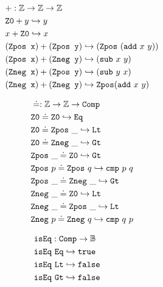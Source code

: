 \begin{figure}
\centering
\begin{minipage}[t]{0.48\textwidth}
\begin{align*}
&+: \mathbb{Z} \rightarrow \mathbb{Z} \rightarrow \mathbb{Z} \\
& \texttt{Z0} + y \hookrightarrow y \\
& x + \texttt{Z0} \hookrightarrow x \\
& (\texttt{Zpos x}) + (\texttt{Zpos y}) \hookrightarrow (\texttt{Zpos}~(\texttt{add}~x~y))  \\
& (\texttt{Zpos x}) + (\texttt{Zneg y}) \hookrightarrow (\texttt{sub}~x~y)  \\
& (\texttt{Zneg x}) + (\texttt{Zpos y}) \hookrightarrow (\texttt{sub}~y~x)  \\
& (\texttt{Zneg x}) + (\texttt{Zneg y}) \hookrightarrow \texttt{Zpos}(\texttt{add}~x~y)  \\
\end{align*}
\hfill
\end{minipage}
\begin{minipage}[t]{0.48\textwidth}
\begin{align*}
&\doteq : \mathbb{Z} \rightarrow \mathbb{Z} \rightarrow \texttt{Comp} \\
& \texttt{Z0} \doteq \texttt{Z0} \hookrightarrow \texttt{Eq} \\
& \texttt{Z0} \doteq \texttt{Zpos}~\_ \hookrightarrow \texttt{Lt} \\
& \texttt{Z0} \doteq \texttt{Zneg}~\_ \hookrightarrow \texttt{Gt} \\
& \texttt{Zpos}~\_ \doteq \texttt{Z0} \hookrightarrow \texttt{Gt} \\
& \texttt{Zpos}~p \doteq \texttt{Zpos}~q \hookrightarrow \texttt{cmp}~p~q \\
& \texttt{Zpos}~\_ \doteq \texttt{Zneg}~\_ \hookrightarrow \texttt{Gt} \\
& \texttt{Zneg}~\_ \doteq \texttt{Z0} \hookrightarrow \texttt{Lt} \\
& \texttt{Zneg}~\_ \doteq \texttt{Zpos}~\_ \hookrightarrow \texttt{Lt} \\
& \texttt{Zneg}~p \doteq \texttt{Zneg}~q \hookrightarrow \texttt{cmp}~q~p \\
\end{align*}
\end{minipage}
\noindent
\[
\begin{array}{l@{\hspace{4em}}l@{\hspace{4em}}l}
\begin{aligned}
  &\tt{isEq} : \tt{Comp} \ra \bb{B} \\
  &\tt{isEq}~\tt{Eq} \re \tt{true} \\
  &\tt{isEq}~\tt{Lt} \re \tt{false} \\
  &\tt{isEq}~\tt{Gt} \re \tt{false} \\
\end{aligned}

\end{array}\]
\end{figure}
